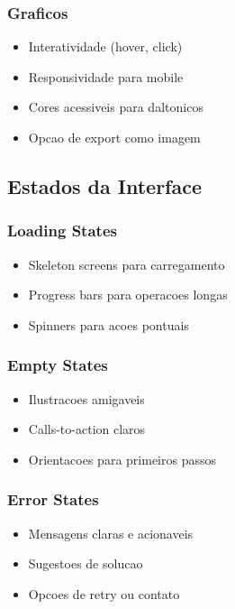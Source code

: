 \subsubsection{Graficos}
\begin{itemize}
    \item Interatividade (hover, click)
    \item Responsividade para mobile
    \item Cores acessiveis para daltonicos
    \item Opcao de export como imagem
\end{itemize}

\subsection{Estados da Interface}

\subsubsection{Loading States}
\begin{itemize}
    \item Skeleton screens para carregamento
    \item Progress bars para operacoes longas
    \item Spinners para acoes pontuais
\end{itemize}

\subsubsection{Empty States}
\begin{itemize}
    \item Ilustracoes amigaveis
    \item Calls-to-action claros
    \item Orientacoes para primeiros passos
\end{itemize}

\subsubsection{Error States}
\begin{itemize}
    \item Mensagens claras e acionaveis
    \item Sugestoes de solucao
    \item Opcoes de retry ou contato
\end{itemize}

